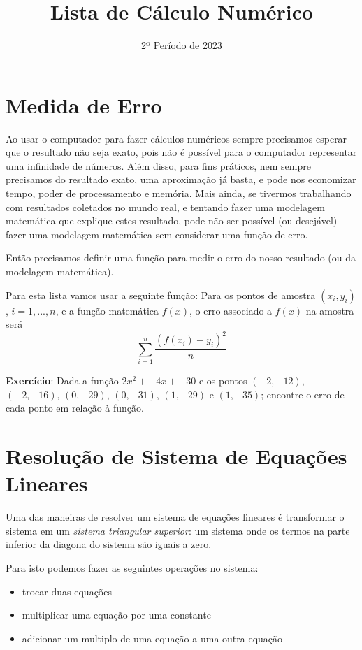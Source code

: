 \documentclass[12pt]{article}
\title{Lista de Cálculo Numérico}
\date{2º Período de 2023}
\begin{document}
\maketitle


\vspace{3em}

\section{Medida de Erro}

Ao usar o computador para fazer cálculos numéricos sempre precisamos esperar que o resultado não seja exato, pois não é possível para o computador representar uma infinidade de números. Além disso, para fins práticos, nem sempre precisamos do resultado exato, uma aproximação já basta, e pode nos economizar tempo, poder de processamento e memória. Mais ainda, se tivermos trabalhando com resultados coletados no mundo real, e tentando fazer uma modelagem matemática que explique estes resultado, pode não ser possível (ou desejável) fazer uma modelagem matemática sem considerar uma função de erro.

Então precisamos definir uma função para medir o erro do nosso resultado (ou da modelagem matemática).

Para esta lista vamos usar a seguinte função: 
Para os pontos de amostra $(x_i, y_i)$, $i = 1, ..., n$, e a função matemática $f(x)$, o erro associado a $f(x)$ na amostra será
\[\sum_{i=1}^{n}\frac{(f(x_i) - y_i)^2}{n}\]

\textbf{Exercício}: Dada a função $2x^2 + -4x + -30$ e os pontos $(-2, -12)$, $(-2, -16)$, $(0, -29)$, $(0, -31)$, $(1, -29)$ e $(1, -35)$; encontre o erro de cada ponto em relação à função.



\break





\section{Resolução de Sistema de Equações Lineares}

Uma das maneiras de resolver um sistema de equações lineares é transformar o sistema em um \textit{sistema triangular superior}: um sistema onde os termos na parte inferior da diagona do sistema são iguais a zero.

Para isto podemos fazer as seguintes operações no sistema:
\begin{itemize}
\item trocar duas equações
\item multiplicar uma equação por uma constante
\item adicionar um multiplo de uma equação a uma outra equação
\end{itemize}
\end{document}
